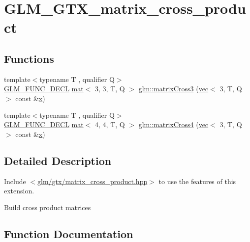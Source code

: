 \hypertarget{group__gtx__matrix__cross__product}{}\section{G\+L\+M\+\_\+\+G\+T\+X\+\_\+matrix\+\_\+cross\+\_\+product}
\label{group__gtx__matrix__cross__product}
\subsection*{Functions}
\begin{DoxyCompactItemize}
\item 
{\footnotesize template$<$typename T , qualifier Q$>$ }\\\mbox{\hyperlink{setup_8hpp_ab2d052de21a70539923e9bcbf6e83a51}{G\+L\+M\+\_\+\+F\+U\+N\+C\+\_\+\+D\+E\+CL}} \mbox{\hyperlink{structglm_1_1mat}{mat}}$<$ 3, 3, T, Q $>$ \mbox{\hyperlink{group__gtx__matrix__cross__product_ga5802386bb4c37b3332a3b6fd8b6960ff}{glm\+::matrix\+Cross3}} (\mbox{\hyperlink{structglm_1_1vec}{vec}}$<$ 3, T, Q $>$ const \&\mbox{\hyperlink{_s_d_l__opengl_8h_ad0e63d0edcdbd3d79554076bf309fd47}{x}})
\item 
{\footnotesize template$<$typename T , qualifier Q$>$ }\\\mbox{\hyperlink{setup_8hpp_ab2d052de21a70539923e9bcbf6e83a51}{G\+L\+M\+\_\+\+F\+U\+N\+C\+\_\+\+D\+E\+CL}} \mbox{\hyperlink{structglm_1_1mat}{mat}}$<$ 4, 4, T, Q $>$ \mbox{\hyperlink{group__gtx__matrix__cross__product_ga20057fff91ddafa102934adb25458cde}{glm\+::matrix\+Cross4}} (\mbox{\hyperlink{structglm_1_1vec}{vec}}$<$ 3, T, Q $>$ const \&\mbox{\hyperlink{_s_d_l__opengl_8h_ad0e63d0edcdbd3d79554076bf309fd47}{x}})
\end{DoxyCompactItemize}


\subsection{Detailed Description}
Include $<$\mbox{\hyperlink{matrix__cross__product_8hpp}{glm/gtx/matrix\+\_\+cross\+\_\+product.\+hpp}}$>$ to use the features of this extension.

Build cross product matrices 

\subsection{Function Documentation}
\mbox{\label{group__gtx__matrix__cross__product_ga5802386bb4c37b3332a3b6fd8b6960ff}} 
